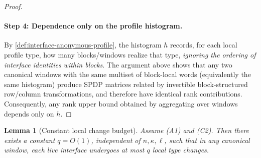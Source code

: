 \documentclass[12pt]{article}
\newtheorem{lemma}[theorem]{Lemma}
\theoremstyle{definition}
\theoremstyle{remark}
\begin{document}
\begin{proof}
\paragraph{Step 4: Dependence only on the profile histogram.}
By \ref{def:interface-anonymous-profile}, the histogram $h$ records, for each local
profile type, how many blocks/windows realize that type, \emph{ignoring the ordering of
interface identities within blocks}. The argument above shows that any two canonical
windows with the same multiset of block-local words (equivalently the same histogram)
produce SPDP matrices related by invertible block-structured row/column transformations,
and therefore have identical rank contributions. Consequently, any rank upper bound
obtained by aggregating over windows depends only on $h$.
\end{proof}

\begin{lemma}[Constant local change budget]
\label{lem:constant-local-change-budget}
Assume (A1) and (C2). Then there exists a constant $q=O(1)$, independent of
$n,\kappa,\ell$, such that in any canonical window, each live interface undergoes at
most $q$ local type changes.
\end{lemma}
\end{document}
